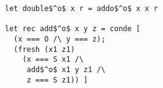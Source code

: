 \begin{figure}[!t]
  \centering
  \begin{minipage}{\columnwidth}
    \begin{lstlisting}[label={double},
                       caption={Doubling and addition relations},
                       captionpos=b,
                       frame=tb]
let double$^o$ x r = addo$^o$ x x r

let rec add$^o$ x y z = conde [
  (x === O /\ y === z);
  (fresh (x1 z1)
    (x === S x1 /\
     add$^o$ x1 y z1 /\
     z === S z1)) ]
    \end{lstlisting}
  \end{minipage}
\end{figure}